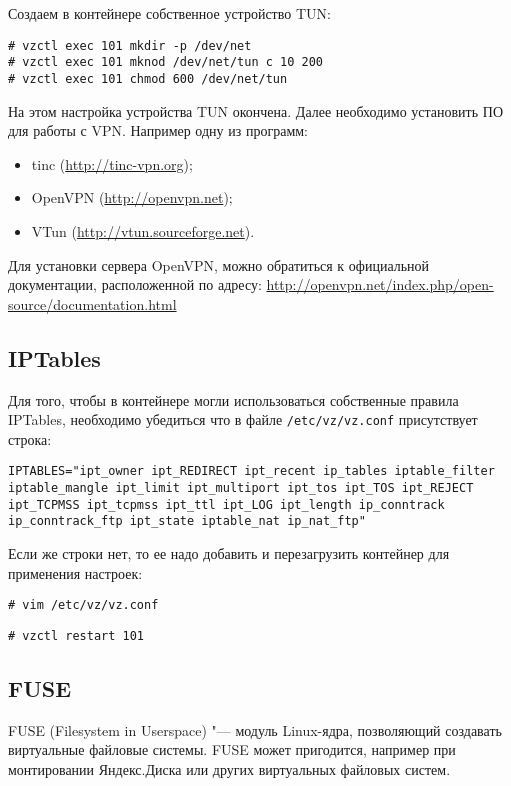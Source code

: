 Создаем в контейнере собственное устройство TUN:
\begin{lstlisting}
# vzctl exec 101 mkdir -p /dev/net
# vzctl exec 101 mknod /dev/net/tun c 10 200
# vzctl exec 101 chmod 600 /dev/net/tun
\end{lstlisting}

На этом настройка устройства TUN окончена.
Далее необходимо установить ПО для работы с VPN.
Например одну из программ:
\begin{itemize}
    \item tinc (\url{http://tinc-vpn.org});
    \item OpenVPN (\url{http://openvpn.net});
    \item VTun (\url{http://vtun.sourceforge.net}).
\end{itemize}

Для установки сервера OpenVPN, можно обратиться к официальной документации, расположенной по адресу: \url{http://openvpn.net/index.php/open-source/documentation.html}

\subsection{IPTables}
Для того, чтобы в контейнере могли использоваться собственные правила IPTables, необходимо убедиться что в файле \texttt{/etc/vz/vz.conf} присутствует строка:
\begin{lstlisting}
IPTABLES="ipt_owner ipt_REDIRECT ipt_recent ip_tables iptable_filter iptable_mangle ipt_limit ipt_multiport ipt_tos ipt_TOS ipt_REJECT ipt_TCPMSS ipt_tcpmss ipt_ttl ipt_LOG ipt_length ip_conntrack ip_conntrack_ftp ipt_state iptable_nat ip_nat_ftp"
\end{lstlisting}

Если же строки нет, то ее надо добавить и перезагрузить контейнер для применения настроек:
\begin{lstlisting}
# vim /etc/vz/vz.conf
\end{lstlisting}
\begin{lstlisting}
# vzctl restart 101
\end{lstlisting}

\subsection{FUSE}
FUSE (Filesystem in Userspace) "--- модуль Linux-ядра, позволяющий создавать виртуальные файловые системы.
FUSE может пригодится, например при монтировании Яндекс.Диска или других виртуальных файловых систем.

